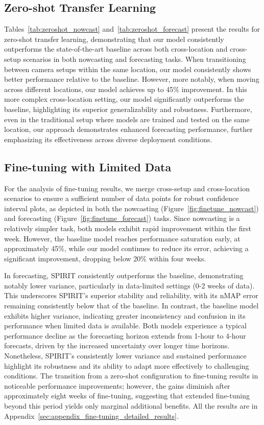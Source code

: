 \subsection{Zero-shot Transfer Learning}

Tables~\ref{tab:zeroshot_nowcast} and~\ref{tab:zeroshot_forecast} present the results for zero-shot transfer learning, demonstrating that our model consistently outperforms the state-of-the-art baseline across both cross-location and cross-setup scenarios in both nowcasting and forecasting tasks. When transitioning between camera setups within the same location, our model consistently shows better performance relative to the baseline. However, more notably, when moving across different locations, our model achieves up to 45\% improvement. In this more complex cross-location setting, our model significantly outperforms the baseline, highlighting its superior generalizability and robustness. Furthermore, even in the traditional setup where models are trained and tested on the same location, our approach demonstrates enhanced forecasting performance, further emphasizing its effectiveness across diverse deployment conditions.

\subsection{Fine-tuning with Limited Data}

For the analysis of fine-tuning results, we merge cross-setup and cross-location scenarios to ensure a sufficient number of data points for robust confidence interval plots, as depicted in both the nowcasting (Figure~\ref{fig:finetune_nowcast}) and forecasting (Figure~\ref{fig:finetune_forecast}) tasks. Since nowcasting is a relatively simpler task, both models exhibit rapid improvement within the first week. However, the baseline model reaches performance saturation early, at approximately 45\%, while our model continues to reduce its error, achieving a significant improvement, dropping below 20\% within four weeks. 

In forecasting, SPIRIT consistently outperforms the baseline, demonstrating notably lower variance, particularly in data-limited settings (0-2 weeks of data). This underscores SPIRIT's superior stability and reliability, with its nMAP error remaining consistently below that of the baseline. In contrast, the baseline model exhibits higher variance, indicating greater inconsistency and confusion in its performance when limited data is available. Both models experience a typical performance decline as the forecasting horizon extends from 1-hour to 4-hour forecasts, driven by the increased uncertainty over longer time horizons. Nonetheless, SPIRIT’s consistently lower variance and sustained performance highlight its robustness and its ability to adapt more effectively to challenging conditions. The transition from a zero-shot configuration to fine-tuning results in noticeable performance improvements; however, the gains diminish after approximately eight weeks of fine-tuning, suggesting that extended fine-tuning beyond this period yields only marginal additional benefits. All the results are in Appendix~\ref{sec:appendix_fine-tuning_detailed_results}.